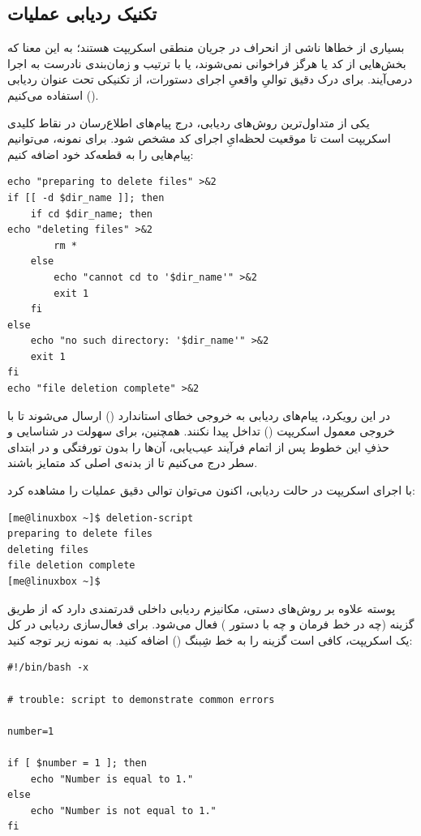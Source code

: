 \subsection{تکنیک ردیابی عملیات}

بسیاری از خطاها ناشی از انحراف در جریان منطقی اسکریپت هستند؛ به این معنا که بخش‌هایی از کد یا هرگز فراخوانی نمی‌شوند، یا با ترتیب و زمان‌بندی نادرست به اجرا درمی‌آیند. برای درک دقیق توالیِ واقعیِ اجرای دستورات، از تکنیکی تحت عنوان ردیابی () استفاده می‌کنیم.

یکی از متداول‌ترین روش‌های ردیابی، درج پیام‌های اطلاع‌رسان در نقاط کلیدی اسکریپت است تا موقعیت لحظه‌ایِ اجرای کد مشخص شود. برای نمونه، می‌توانیم پیام‌هایی را به قطعه‌کد خود اضافه کنیم:

\begin{latin}
\begin{lstlisting}
echo "preparing to delete files" >&2
if [[ -d $dir_name ]]; then
    if cd $dir_name; then
echo "deleting files" >&2
        rm *
    else
        echo "cannot cd to '$dir_name'" >&2
        exit 1
    fi
else
    echo "no such directory: '$dir_name'" >&2
    exit 1
fi
echo "file deletion complete" >&2
\end{lstlisting}
\end{latin}

در این رویکرد، پیام‌های ردیابی به خروجی خطای استاندارد () ارسال می‌شوند تا با خروجی معمول اسکریپت () تداخل پیدا نکنند. همچنین، برای سهولت در شناسایی و حذفِ این خطوط پس از اتمام فرآیند عیب‌یابی، آن‌ها را بدون تورفتگی و در ابتدای سطر درج می‌کنیم تا از بدنه‌ی اصلی کد متمایز باشند.

با اجرای اسکریپت در حالت ردیابی، اکنون می‌توان توالی دقیق عملیات را مشاهده کرد:

\begin{latin}
\begin{lstlisting}
[me@linuxbox ~]$ deletion-script
preparing to delete files
deleting files
file deletion complete
[me@linuxbox ~]$
\end{lstlisting}
\end{latin}

پوسته  علاوه بر روش‌های دستی، مکانیزم ردیابی داخلی قدرتمندی دارد که از طریق گزینه  (چه در خط فرمان و چه با دستور ) فعال می‌شود. برای فعال‌سازی ردیابی در کل یک اسکریپت، کافی است گزینه  را به خط شِبنگ () اضافه کنید. به نمونه زیر توجه کنید:

\begin{latin}
\begin{lstlisting}
#!/bin/bash -x

# trouble: script to demonstrate common errors

number=1

if [ $number = 1 ]; then
    echo "Number is equal to 1."
else
    echo "Number is not equal to 1."
fi
\end{lstlisting}
\end{latin}

